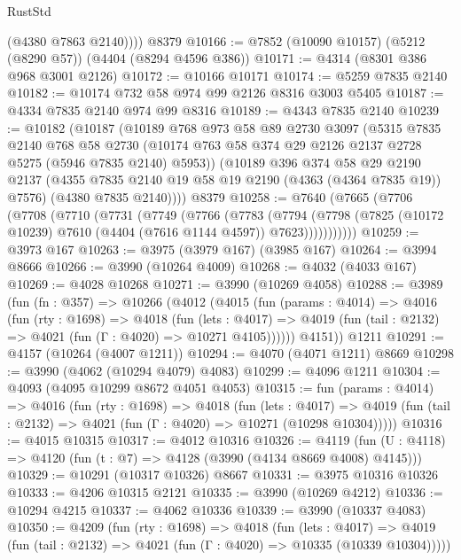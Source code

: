 \begin{lexlean}{RustStd}
\begin{coremodule}
          (@4380 @7863 @2140))))
    @8379
@10166 := @7852 (@10090 @10157) (@5212 (@8290 @57)) (@4404 (@8294 @4596 @386))
@10171 := @4314 (@8301 @386 @968 @3001 @2126)
@10172 := @10166 @10171
@10174 := @5259 @7835 @2140
@10182 := @10174 @732 @58 @974 @99 @2126 @8316 @3003 @5405
@10187 := @4334 @7835 @2140 @974 @99 @8316
@10189 := @4343 @7835 @2140
@10239 := @10182
    (@10187
      (@10189
        @768
        @973
        @58
        @89
        @2730
        @3097
        (@5315
          @7835
          @2140
          @768
          @58
          @2730
          (@10174 @763 @58 @374 @29 @2126 @2137 @2728 @5275 (@5946 @7835 @2140) @5953))
        (@10189
          @396
          @374
          @58
          @29
          @2190
          @2137
          (@4355 @7835 @2140 @19 @58 @19 @2190 (@4363 (@4364 @7835 @19)) @7576)
          (@4380 @7835 @2140))))
    @8379
@10258 := @7640
    (@7665
      (@7706
        (@7708
          (@7710
            (@7731
              (@7749
                (@7766
                  (@7783
                    (@7794
                      (@7798
                        (@7825 (@10172 @10239) @7610 (@4404 (@7616 @1144 @4597)) @7623)))))))))))
@10259 := @3973 @167
@10263 := @3975 (@3979 @167) (@3985 @167)
@10264 := @3994 @8666
@10266 := @3990 (@10264 @4009)
@10268 := @4032 (@4033 @167)
@10269 := @4028 @10268
@10271 := @3990 (@10269 @4058)
@10288 := @3989
    (fun (fn : @357) =>
    @10266
      (@4012
        (@4015
          (fun (params : @4014) =>
          @4016
            (fun (rty : @1698) =>
            @4018
              (fun (lets : @4017) =>
              @4019 (fun (tail : @2132) => @4021 (fun (Γ : @4020) => @10271 @4105))))))
        @4151))
    @1211
@10291 := @4157 (@10264 (@4007 @1211))
@10294 := @4070 (@4071 @1211) @8669
@10298 := @3990 (@4062 (@10294 @4079) @4083)
@10299 := @4096 @1211
@10304 := @4093 (@4095 @10299 @8672 @4051 @4053)
@10315 := fun (params : @4014) =>
  @4016
    (fun (rty : @1698) =>
    @4018
      (fun (lets : @4017) =>
      @4019 (fun (tail : @2132) => @4021 (fun (Γ : @4020) => @10271 (@10298 @10304)))))
@10316 := @4015 @10315
@10317 := @4012 @10316
@10326 := @4119 (fun (U : @4118) => @4120 (fun (t : @7) => @4128 (@3990 (@4134 @8669 @4008) @4145)))
@10329 := @10291 (@10317 @10326) @8667
@10331 := @3975 @10316 @10326
@10333 := @4206 @10315 @2121
@10335 := @3990 (@10269 @4212)
@10336 := @10294 @4215
@10337 := @4062 @10336
@10339 := @3990 (@10337 @4083)
@10350 := @4209
    (fun (rty : @1698) =>
    @4018
      (fun (lets : @4017) =>
      @4019 (fun (tail : @2132) => @4021 (fun (Γ : @4020) => @10335 (@10339 @10304)))))

\end{coremodule}
\end{lexlean}
